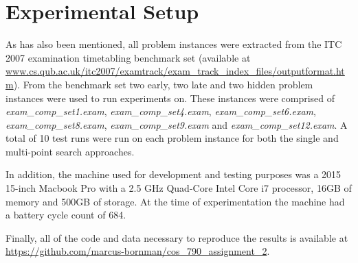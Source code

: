 \section{Experimental Setup}\label{sec:experimental_setup}
As has also been mentioned, all problem instances were extracted from the ITC 2007 examination timetabling benchmark set \cite{mccollum2010setting} (available at \url{www.cs.qub.ac.uk/itc2007/examtrack/exam_track_index_files/outputformat.htm}). From the benchmark set \cite{mccollum2010setting} two early, two late and two hidden problem instances were used to run experiments on. These instances were comprised of \emph{exam\_comp\_set1.exam}, \emph{exam\_comp\_set4.exam}, \emph{exam\_comp\_set6.exam}, \emph{exam\_comp\_set8.exam}, \emph{exam\_comp\_set9.exam} and \emph{exam\_comp\_set12.exam}. A total of 10 test runs were run on each problem instance for both the single and multi-point search approaches.

In addition, the machine used for development and testing purposes was a 2015 15-inch Macbook Pro with a 2.5 GHz Quad-Core Intel Core i7 processor, 16GB of memory and 500GB of storage. At the time of experimentation the machine had a battery cycle count of 684. 

Finally, all of the code and data necessary to reproduce the results is available at \url{https://github.com/marcus-bornman/cos_790_assignment_2}.